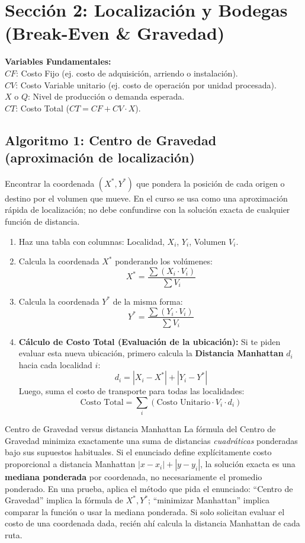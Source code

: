 \section{Sección 2: Localización y Bodegas (Break-Even \& Gravedad)}

\begin{tcolorbox}[enhanced, breakable, colback=blue!5!white,colframe=blue!60!black,title=Parámetros del Modelo]
\textbf{Variables Fundamentales:}\\
$CF$: Costo Fijo (ej. costo de adquisición, arriendo o instalación).\\
$CV$: Costo Variable unitario (ej. costo de operación por unidad procesada).\\
$X$ o $Q$: Nivel de producción o demanda esperada.\\
$CT$: Costo Total ($CT = CF + CV \cdot X$).
\end{tcolorbox}

\subsection{Algoritmo 1: Centro de Gravedad (aproximación de localización)}
Encontrar la coordenada $(X^*, Y^*)$ que pondera la posición de cada origen o
destino por el volumen que mueve. En el curso se usa como una aproximación
rápida de localización; no debe confundirse con la solución exacta de cualquier
función de distancia.

\begin{enumerate}
    \item Haz una tabla con columnas: Localidad, $X_i$, $Y_i$, Volumen $V_i$.
    \item Calcula la coordenada $X^*$ ponderando los volúmenes:
    $$ X^* = \frac{\sum (X_i \cdot V_i)}{\sum V_i} $$
    \item Calcula la coordenada $Y^*$ de la misma forma:
    $$ Y^* = \frac{\sum (Y_i \cdot V_i)}{\sum V_i} $$
    \item \textbf{Cálculo de Costo Total (Evaluación de la ubicación):} Si te piden evaluar esta nueva ubicación, primero calcula la \textbf{Distancia Manhattan} $d_i$ hacia cada localidad $i$:
    $$ d_i = |X_i - X^*| + |Y_i - Y^*| $$
    Luego, suma el costo de transporte para todas las localidades:
    $$ \text{Costo Total} = \sum_{i} (\text{Costo Unitario} \cdot V_i \cdot d_i) $$
\end{enumerate}

\begin{trampa}{Centro de Gravedad versus distancia Manhattan}
La fórmula del Centro de Gravedad minimiza exactamente una suma de distancias
\emph{cuadráticas} ponderadas bajo sus supuestos habituales. Si el enunciado
define explícitamente costo proporcional a distancia Manhattan
$|x-x_i|+|y-y_i|$, la solución exacta es una \textbf{mediana ponderada} por
coordenada, no necesariamente el promedio ponderado. En una prueba, aplica el
método que pida el enunciado: ``Centro de Gravedad'' implica la fórmula de
$X^*,Y^*$; ``minimizar Manhattan'' implica comparar la función o usar la
mediana ponderada. Si solo solicitan evaluar el costo de una coordenada dada,
recién ahí calcula la distancia Manhattan de cada ruta.
\end{trampa}

